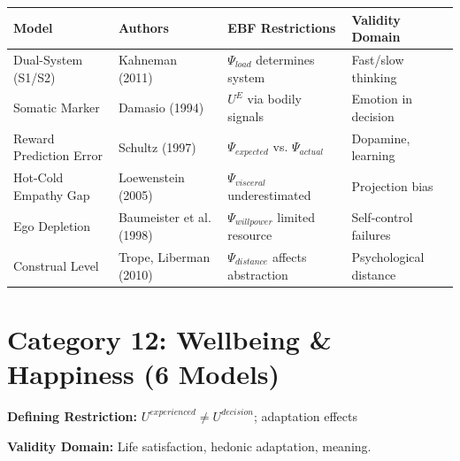 \small
\begin{longtable}{@{}p{3cm}p{2.5cm}p{4cm}p{4cm}@{}}
\toprule
\textbf{Model} & \textbf{Authors} & \textbf{EBF Restrictions} & \textbf{Validity Domain} \\
\midrule
\endhead

Dual-System (S1/S2) & Kahneman (2011) &
$\Psi_{load}$ determines system &
Fast/slow thinking \\

Somatic Marker & Damasio (1994) &
$U^{E}$ via bodily signals &
Emotion in decision \\

Reward Prediction Error & Schultz (1997) &
$\Psi_{expected}$ vs. $\Psi_{actual}$ &
Dopamine, learning \\

Hot-Cold Empathy Gap & Loewenstein (2005) &
$\Psi_{visceral}$ underestimated &
Projection bias \\

Ego Depletion & Baumeister et al. (1998) &
$\Psi_{willpower}$ limited resource &
Self-control failures \\

Construal Level & Trope, Liberman (2010) &
$\Psi_{distance}$ affects abstraction &
Psychological distance \\

\bottomrule
\end{longtable}
\normalsize

\section{Category 12: Wellbeing \& Happiness (6 Models)}
\label{sec:ms-wellbeing}

\begin{tcolorbox}[colback=gray!5!white, colframe=gray!75!black,
    title=\textbf{Wellbeing: The Experienced Utility Extension}]

\textbf{Defining Restriction:} $U^{experienced} \neq U^{decision}$; adaptation effects

\textbf{Validity Domain:} Life satisfaction, hedonic adaptation, meaning.

\end{tcolorbox}


